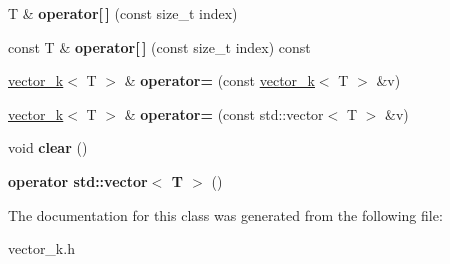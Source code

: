 \begin{DoxyCompactItemize}
\item 
\hypertarget{classkeycpp_1_1vector__k_aa7bae542df2d3ceeab63ab137a52df94}{T \& {\bfseries operator\mbox{[}$\,$\mbox{]}} (const size\-\_\-t index)}\label{classkeycpp_1_1vector__k_aa7bae542df2d3ceeab63ab137a52df94}

\item 
\hypertarget{classkeycpp_1_1vector__k_af9fc299b3eecce09bb7166954acf7b16}{const T \& {\bfseries operator\mbox{[}$\,$\mbox{]}} (const size\-\_\-t index) const }\label{classkeycpp_1_1vector__k_af9fc299b3eecce09bb7166954acf7b16}

\item 
\hypertarget{classkeycpp_1_1vector__k_ab2030403334539d7df1001e8b9037fa9}{\hyperlink{classkeycpp_1_1vector__k}{vector\-\_\-k}$<$ T $>$ \& {\bfseries operator=} (const \hyperlink{classkeycpp_1_1vector__k}{vector\-\_\-k}$<$ T $>$ \&v)}\label{classkeycpp_1_1vector__k_ab2030403334539d7df1001e8b9037fa9}

\item 
\hypertarget{classkeycpp_1_1vector__k_a318832966719bc35aa0147ec2aeabb6f}{\hyperlink{classkeycpp_1_1vector__k}{vector\-\_\-k}$<$ T $>$ \& {\bfseries operator=} (const std\-::vector$<$ T $>$ \&v)}\label{classkeycpp_1_1vector__k_a318832966719bc35aa0147ec2aeabb6f}

\item 
\hypertarget{classkeycpp_1_1vector__k_a926f7d20093e3b36e92f10aaeea1e909}{void {\bfseries clear} ()}\label{classkeycpp_1_1vector__k_a926f7d20093e3b36e92f10aaeea1e909}

\item 
\hypertarget{classkeycpp_1_1vector__k_a54ffbb92ed1926e6066d26db886b4132}{{\bfseries operator std\-::vector$<$ T $>$} ()}\label{classkeycpp_1_1vector__k_a54ffbb92ed1926e6066d26db886b4132}

\end{DoxyCompactItemize}


The documentation for this class was generated from the following file\-:\begin{DoxyCompactItemize}
\item 
vector\-\_\-k.\-h\end{DoxyCompactItemize}
